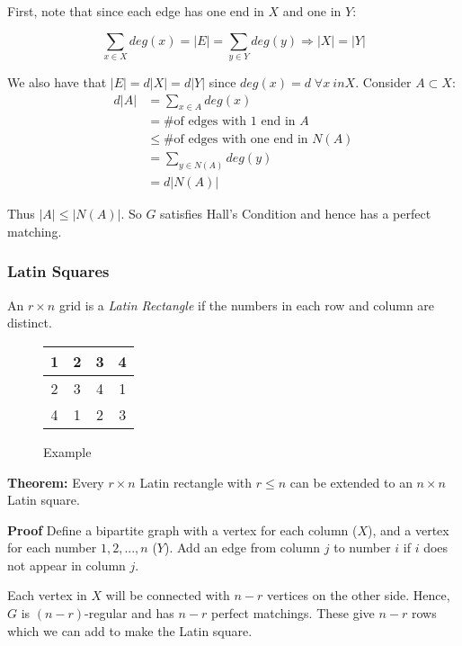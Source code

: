 \documentclass[11pt, letterpaper, oneside]{article}
\begin{document}
First, note that since each edge has one end in $X$ and one in $Y$:

$$ \sum_{x \in X} deg(x) = |E| = \sum_{y \in Y}  deg(y) \Rightarrow |X|=|Y| $$

We also have that $|E| = d|X| = d|Y|$ since $deg(x)=d \; \forall x \ in X$. Consider $A \subset X$:
\begin{align*}
	d|A| &=\sum_{x \in A} deg(x) \\
		 &= \text{\# of edges with 1 end in } A \\
		 &\leq \text{\# of edges with one end in } N(A) \\
		 &= \sum_{y \in N(A)} deg(y) \\
		 &= d|N(A)|
\end{align*}

Thus $|A| \leq |N(A)|$. So $G$ satisfies Hall's Condition and hence has a perfect matching.

\subsubsection{Latin Squares}
An $r \times n$ grid is a \textit{Latin Rectangle} if the numbers in each row and column are distinct.

\begin{wrapfigure}{r}{0.15\textwidth}
	\caption*{Example}
	\begin{tabular}{|c|c|c|c|}
		\hline 1 & 2 & 3 & 4 \\ 
		\hline 2 & 3 & 4 & 1 \\ 
		\hline 4 & 1 & 2 & 3 \\ 
		\hline 
	\end{tabular}
\end{wrapfigure}

\textbf{Theorem:} Every $r \times n$ Latin rectangle with $r \leq n$ can be extended to an $n \times n$ Latin square.

\textbf{Proof} Define a bipartite graph with a vertex for each column ($X$), and a vertex for each number $1, 2, ..., n$ ($Y$). Add an edge from column $j$ to number $i$ if $i$ does not appear in column $j$.

Each vertex in $X$ will be connected with $n-r$ vertices on the other side. Hence, $G$ is $(n-r)$-regular and has $n-r$ perfect matchings. These give $n-r$ rows which we can add to make the Latin square.
\end{document}
